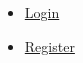\begin{itemize}
\itemsep1pt\parskip0pt
\item
  \href{/login}{Login}
\item
  \href{/register}{Register}
\end{itemize}
